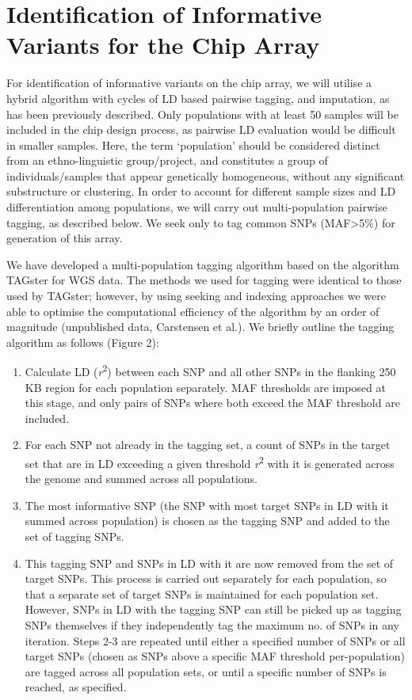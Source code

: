 \section{Identification of Informative Variants for the Chip Array}

For identification of informative variants on the chip array, we will utilise a hybrid algorithm with cycles of LD based pairwise tagging, and imputation, as has been previously described.\cite{Hoffmann2011422} Only populations with at least 50 samples will be included in the chip design process, as pairwise LD evaluation would be difficult in smaller samples. Here, the term ‘population’ should be considered distinct from an ethno-linguistic group/project, and constitutes a group of individuals/samples that appear genetically homogeneous, without any significant substructure or clustering. In order to account for different sample sizes and LD differentiation among populations, we will carry out multi-population pairwise tagging, as described below. We seek only to tag common SNPs (MAF\textgreater5\%) for generation of this array.

We have developed a multi-population tagging algorithm based on the algorithm TAGster for WGS data.\cite{Xu2007} The methods we used for tagging were identical to those used by TAGster; however, by using seeking and indexing approaches we were able to optimise the computational efficiency of the algorithm by an order of magnitude (unpublished data, Carstensen et al.). We briefly outline the tagging algorithm as follows (Figure 2):

\begin{enumerate}
\item Calculate LD (\textit{r}\textsuperscript{2}) between each SNP and all other SNPs in the flanking 250 KB region for each population separately. MAF thresholds are imposed at this stage, and only pairs of SNPs where both exceed the MAF threshold are included.
\item For each SNP not already in the tagging set, a count of SNPs in the target set that are in LD exceeding a given threshold \textit{r}\textsuperscript{2} with it is generated across the genome and summed across all populations.
\item The most informative SNP (the SNP with most target SNPs in LD with it summed across population) is chosen as the tagging SNP and added to the set of tagging SNPs.
\item This tagging SNP and SNPs in LD with it are now removed from the set of target SNPs. This process is carried out separately for each population, so that a separate set of target SNPs is maintained for each population set. However, SNPs in LD with the tagging SNP can still be picked up as tagging SNPs themselves if they independently tag the maximum no. of SNPs in any iteration.
Steps 2-3 are repeated until either a specified number of SNPs or all target SNPs (chosen as SNPs above a specific MAF threshold per-population) are tagged across all population sets, or until a specific number of SNPs is reached, as specified.
\end{enumerate}

